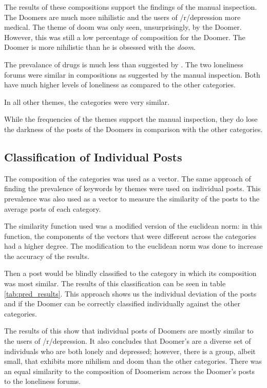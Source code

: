 \documentclass[../report.tex]{subfiles}
\begin{document}
The results of these compositions support the findings of the manual inspection. 
The Doomers are much more nihilistic and the users of /r/depression more medical.
The theme of doom was only seen, unsurprisingly, by the Doomer.
However, this was still a low percentage of composition for the Doomer. 
The Doomer is more nihilistic than he is obsessed with the \textit{doom}.

The prevalance of drugs is much less than suggested by \cite*{twitter_loneliness}.
The two loneliness forums were similar in compositions as suggested by the manual inspection. 
Both have much higher levels of loneliness as compared to the other categories. 

In all other themes, the categories were very similar. 

While the frequencies of the themes support the manual inspection, they do lose the darkness of the posts of the Doomers in comparison with the other categories.



\subsection{Classification of Individual Posts}
The composition of the categories was used as a vector. 
The same approach of finding the prevalence of keywords by themes were used on individual posts.
This prevalence was also used as a vector to measure the similarity of the posts to the average posts of each category. 

The similarity function used was a modified version of the euclidean norm: in this function, the components of the vectors that were different across the categories had a higher degree. 
The modification to the euclidean norm was done to increase the accuracy of the results.

Then a post would be blindly classified to the category in which its composition was most similar. 
The results of this classification can be seen in table \ref{tab:pred_results}.
This approach shows us the individual deviation of the posts and if the Doomer can be correctly classified individually against the other categories.

The results of this show that individual posts of Doomers are mostly similar to the users of /r/depression. 
It also concludes that Doomer's are a diverse set of individuals who are both lonely and depressed; however, there is a group, albeit small, that exhibits more nihilism and doom than the other categories.
There was an equal similarity to the composition of Doomerism across the Doomer's posts to the loneliness forums.
\end{document}
